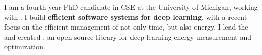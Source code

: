 

\begin{cvparagraph}

I am a fourth year PhD candidate in CSE at the University of Michigan, working with \href{https://mosharaf.com}{}.
I build \textbf{efficient software systems for deep learning}, with a recent focus on the efficient management of not only time, but also energy.
I lead the \href{https://ml.energy}{} and created \href{https://ml.energy/zeus}{}, an open-source library for deep learning energy measurement and optimization.
\end{cvparagraph}
